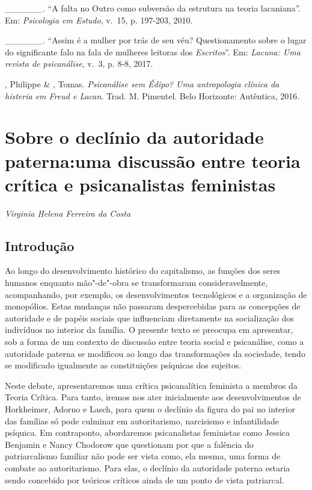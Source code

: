 \begin{Parskip}
\_\_\_\_\_\_. ``A falta no Outro como subversão da estrutura na teoria
lacaniana''. Em: \emph{Psicologia em Estudo}, v.~15, p. 197-203, 2010.

\_\_\_\_\_\_. ``Assim é a mulher por trás de seu véu? Questionamento
sobre o lugar do significante falo na fala de mulheres leitoras dos
\emph{Escritos}''. Em: \emph{Lacuna: Uma revista de psicanálise}, v.~3, p.
8-8, 2017. %

, Philippe \& , Tomas. \emph{Psicanálise sem Édipo? Uma
antropologia clínica da histeria em Freud e Lacan}. Trad. M. Pimentel.
Belo Horizonte: Autêntica, 2016.
\end{Parskip}


\chapter*{Sobre o declínio da autoridade paterna:\break uma discussão entre
teoria crítica e psicanalistas feministas}


\begin{flushright}
\emph{Virginia Helena Ferreira da Costa}
\end{flushright}

\section{Introdução}

Ao longo do desenvolvimento histórico do capitalismo, as funções dos
seres humanos enquanto mão"-de"-obra se transformaram consideravelmente,
acompanhando, por exemplo, os desenvolvimentos tecnológicos e a
organização de monopólios. Estas mudanças não passaram despercebidas
para as concepções de autoridade e de papéis sociais que influenciam
diretamente na socialização dos indivíduos no interior da família. O
presente texto se preocupa em apresentar, sob a forma de um contexto de
discussão entre teoria social e psicanálise, como a autoridade paterna
se modificou ao longo das transformações da sociedade, tendo se
modificado igualmente as constituições psíquicas dos sujeitos.

Neste debate, apresentaremos uma crítica psicanalítica feminista a
membros da Teoria Crítica. Para tanto, iremos nos ater inicialmente aos
desenvolvimentos de Horkheimer, Adorno e Lasch, para quem o declínio da
figura do pai no interior das famílias só pode culminar em
autoritarismo, narcisismo e infantilidade psíquica. Em contraponto,
abordaremos psicanalistas feministas como Jessica Benjamin e Nancy
Chodorow que questionam por que a falência do patriarcalismo familiar
não pode ser vista como, ela mesma, uma forma de combate ao
autoritarismo. Para elas, o declínio da autoridade paterna estaria sendo
concebido por teóricos críticos ainda de um ponto de vista patriarcal.

